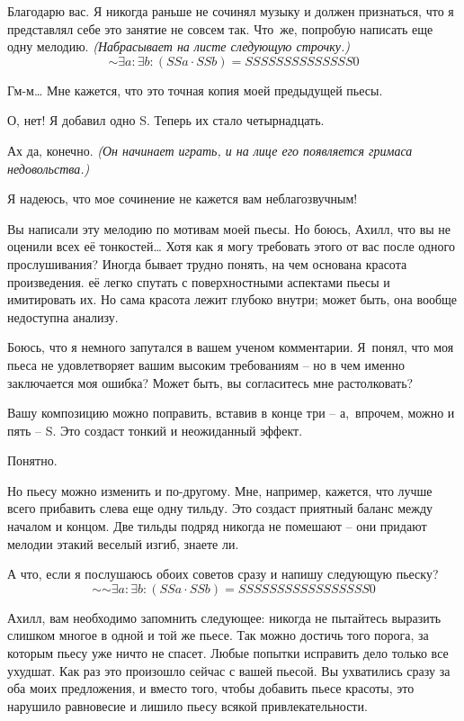 \documentclass[../main.tex]{subfiles}
\begin{document}
\begin{dialogue}
 Благодарю вас. Я никогда раньше не сочинял музыку и должен признаться, что я представлял себе это занятие не совсем так. Что~же, попробую написать еще одну мелодию. \emph{(Набрасывает на листе следующую строчку.)}
\[
    \mathord{\sim} \exists a \colon \exists b \colon (SSa \cdot SSb) = SSSSSSSSSSSSSS0
\]

 Гм-м\ldots{} Мне кажется, что это точная копия моей предыдущей пьесы.

 О, нет! Я добавил одно S\@. Теперь их стало четырнадцать.

 Ах да, конечно. \emph{(Он начинает играть, и на лице его появляется гримаса недовольства.)}

 Я надеюсь, что мое сочинение не кажется вам неблагозвучным!

 Вы написали эту мелодию по мотивам моей пьесы. Но боюсь, Ахилл, что вы не оценили всех её тонкостей\ldots{} Хотя как я могу требовать этого от вас после одного прослушивания? Иногда бывает трудно понять, на чем основана красота произведения. её легко спутать с поверхностными аспектами пьесы и имитировать их. Но сама красота лежит глубоко внутри; может быть, она вообще недоступна анализу.

 Боюсь, что я немного запутался в вашем ученом комментарии. Я~понял, что моя пьеса не удовлетворяет вашим высоким требованиям \--- но в чем именно заключается моя ошибка? Может быть, вы согласитесь мне растолковать?

 Вашу композицию можно поправить, вставив в конце три \--- а,~впрочем, можно и пять \--- S. Это создаст тонкий и неожиданный эффект.

 Понятно.

 Но пьесу можно изменить и по-другому. Мне, например, кажется, что лучше всего прибавить слева еще одну тильду. Это создаст приятный баланс между началом и концом. Две тильды подряд никогда не помешают \--- они придают мелодии этакий веселый изгиб, знаете ли.

 А что, если я послушаюсь обоих советов сразу и напишу следующую пьеску?
\[
    \mathord{\sim}\mathord{\sim} \exists a \colon \exists b \colon (SSa \cdot SSb) = SSSSSSSSSSSSSSSSS0
\]

 Ахилл, вам необходимо запомнить следующее: никогда не пытайтесь выразить слишком многое в одной и той же пьесе. Так можно достичь того порога, за которым пьесу уже ничто не спасет. Любые попытки исправить дело только все ухудшат. Как раз это произошло сейчас с вашей пьесой. Вы ухватились сразу за оба моих предложения, и вместо того, чтобы добавить пьесе красоты, это нарушило равновесие и лишило пьесу всякой привлекательности.


\end{dialogue}
\end{document}
